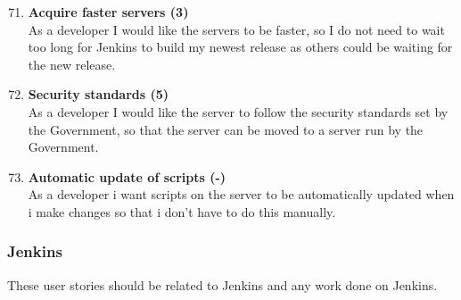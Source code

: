 \begin{enumerate}
	\setcounter{enumi}{70} %
	\item \textbf{Acquire faster servers (3)} \\
	As a developer I would like the servers to be faster, so I do not need to wait too long for Jenkins to build my newest release as others could be waiting for the new release.
	
	\item \textbf{Security standards (5)} \\
	As a developer I would like the server to follow the security standards set by the Government, so that the server can be moved to a server run by the Government.
	
	\item \textbf{Automatic update of scripts (-)} \\
	As a developer i want scripts on the server to be automatically updated when i make changes so that i don't have to do this manually.
\end{enumerate}

\subsubsection{Jenkins}
These user stories should be related to Jenkins and any work done on Jenkins.


